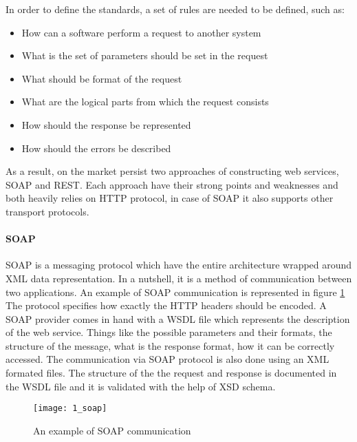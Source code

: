 In order to define the standards, a set of rules are needed to be defined, such as:
\begin{itemize}
    \item How can a software perform a request to another system
    \item What is the set of parameters should be set in the request
    \item What should be format of the request
    \item What are the logical parts from which the request consists
    \item How should the response be represented
    \item How should the errors be described
\end{itemize}

As a result, on the market persist two approaches of constructing web services, SOAP and REST. Each approach have their strong points and weaknesses and both heavily relies on HTTP protocol, in case of SOAP it also supports other transport protocols.

\paragraph{SOAP}
SOAP is a messaging protocol which have the entire architecture wrapped around XML data representation. In a nutshell, it is a method of communication between two applications. An example of SOAP communication is represented in figure \ref{soap} The protocol specifies how exactly the HTTP headers should be encoded. A SOAP provider comes in hand with a WSDL file which represents the description of the web service. Things like the possible parameters and their formats, the structure of the message, what is the response format, how it can be correctly accessed. The communication via SOAP protocol is also done using an XML formated files. The structure of the the request and response is documented in the WSDL file and it is validated with the help of XSD schema.

\begin{figure}[!ht]
\centering
\texttt{[image: 1\_soap]}
\caption{An example of SOAP communication}\label{soap}
\end{figure}


